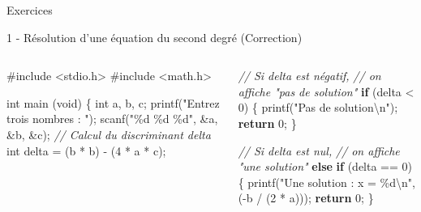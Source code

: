 \documentclass[
  10pt,
  french,
  ignorenonframetext,
  aspectratio=169,
]{beamer}
\newenvironment{Shaded}{}{}
\newcommand{\CommentTok}[1]{\textcolor[rgb]{0.38,0.63,0.69}{\textit{#1}}}
\newcommand{\ControlFlowTok}[1]{\textcolor[rgb]{0.00,0.44,0.13}{\textbf{#1}}}
\newcommand{\DataTypeTok}[1]{\textcolor[rgb]{0.56,0.13,0.00}{#1}}
\newcommand{\DecValTok}[1]{\textcolor[rgb]{0.25,0.63,0.44}{#1}}
\newcommand{\ImportTok}[1]{#1}
\newcommand{\NormalTok}[1]{#1}
\newcommand{\OperatorTok}[1]{\textcolor[rgb]{0.40,0.40,0.40}{#1}}
\newcommand{\PreprocessorTok}[1]{\textcolor[rgb]{0.74,0.48,0.00}{#1}}
\newcommand{\SpecialCharTok}[1]{\textcolor[rgb]{0.25,0.44,0.63}{#1}}
\newcommand{\StringTok}[1]{\textcolor[rgb]{0.25,0.44,0.63}{#1}}
\begin{document}
\begin{frame}[fragile]{Exercices}
\protect\hypertarget{exercices-1}{}
\begin{block}{1 - Résolution d'une équation du second degré
(Correction)}
\protect\hypertarget{ruxe9solution-dune-uxe9quation-du-second-degruxe9-correction}{}
\begin{columns}[T]
\begin{column}{0.48\textwidth}
\begin{Shaded}
\begin{Highlighting}[]
\PreprocessorTok{\#include }\ImportTok{\textless{}stdio.h\textgreater{}}
\PreprocessorTok{\#include }\ImportTok{\textless{}math.h\textgreater{}}

\DataTypeTok{int}\NormalTok{ main }\OperatorTok{(}\DataTypeTok{void}\OperatorTok{)} \OperatorTok{\{}
    \DataTypeTok{int}\NormalTok{ a}\OperatorTok{,}\NormalTok{ b}\OperatorTok{,}\NormalTok{ c}\OperatorTok{;}
\NormalTok{    printf}\OperatorTok{(}\StringTok{"Entrez trois nombres : "}\OperatorTok{);}
\NormalTok{    scanf}\OperatorTok{(}\StringTok{"\%d \%d \%d"}\OperatorTok{,} \OperatorTok{\&}\NormalTok{a}\OperatorTok{,} \OperatorTok{\&}\NormalTok{b}\OperatorTok{,} \OperatorTok{\&}\NormalTok{c}\OperatorTok{);}
    \CommentTok{// Calcul du discriminant delta}
    \DataTypeTok{int}\NormalTok{ delta }\OperatorTok{=} \OperatorTok{(}\NormalTok{b }\OperatorTok{*}\NormalTok{ b}\OperatorTok{)} \OperatorTok{{-}} \OperatorTok{(}\DecValTok{4} \OperatorTok{*}\NormalTok{ a }\OperatorTok{*}\NormalTok{ c}\OperatorTok{);}
\end{Highlighting}
\end{Shaded}
\end{column}

\begin{column}{0.48\textwidth}
\begin{Shaded}
\begin{Highlighting}[]
    \CommentTok{// Si delta est négatif, }
    \CommentTok{// on affiche "pas de solution"}
    \ControlFlowTok{if} \OperatorTok{(}\NormalTok{delta }\OperatorTok{\textless{}} \DecValTok{0}\OperatorTok{)} \OperatorTok{\{}
\NormalTok{        printf}\OperatorTok{(}\StringTok{"Pas de solution}\SpecialCharTok{\textbackslash{}n}\StringTok{"}\OperatorTok{);}
        \ControlFlowTok{return} \DecValTok{0}\OperatorTok{;}
    \OperatorTok{\}}

    \CommentTok{// Si delta est nul, }
    \CommentTok{// on affiche "une solution"}
    \ControlFlowTok{else} \ControlFlowTok{if} \OperatorTok{(}\NormalTok{delta }\OperatorTok{==} \DecValTok{0}\OperatorTok{)} \OperatorTok{\{}
\NormalTok{        printf}\OperatorTok{(}\StringTok{"Une solution : x = \%d}\SpecialCharTok{\textbackslash{}n}\StringTok{"}\OperatorTok{,} 
            \OperatorTok{({-}}\NormalTok{b }\OperatorTok{/} \OperatorTok{(}\DecValTok{2} \OperatorTok{*}\NormalTok{ a}\OperatorTok{)));}
        \ControlFlowTok{return} \DecValTok{0}\OperatorTok{;}
    \OperatorTok{\}}
\end{Highlighting}
\end{Shaded}
\end{column}
\end{columns}
\end{block}
\end{frame}
\end{document}
